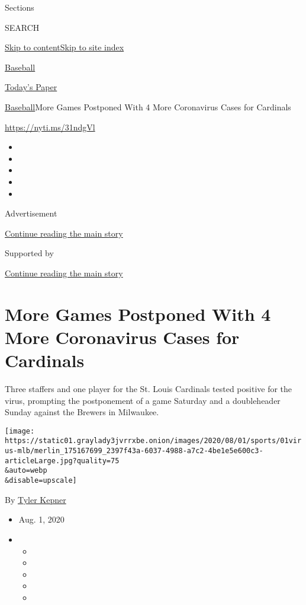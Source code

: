 Sections

SEARCH

\protect\hyperlink{site-content}{Skip to
content}\protect\hyperlink{site-index}{Skip to site index}

\href{https://www.nytimes3xbfgragh.onion/section/sports/baseball}{Baseball}

\href{https://myaccount.nytimes3xbfgragh.onion/auth/login?response_type=cookie\&client_id=vi}{}

\href{https://www.nytimes3xbfgragh.onion/section/todayspaper}{Today's
Paper}

\href{/section/sports/baseball}{Baseball}\textbar{}More Games Postponed
With 4 More Coronavirus Cases for Cardinals

\url{https://nyti.ms/31ndgVl}

\begin{itemize}
\item
\item
\item
\item
\item
\end{itemize}

Advertisement

\protect\hyperlink{after-top}{Continue reading the main story}

Supported by

\protect\hyperlink{after-sponsor}{Continue reading the main story}

\hypertarget{more-games-postponed-with-4-more-coronavirus-cases-for-cardinals}{%
\section{More Games Postponed With 4 More Coronavirus Cases for
Cardinals}\label{more-games-postponed-with-4-more-coronavirus-cases-for-cardinals}}

Three staffers and one player for the St. Louis Cardinals tested
positive for the virus, prompting the postponement of a game Saturday
and a doubleheader Sunday against the Brewers in Milwaukee.

\texttt{[image: https://static01.graylady3jvrrxbe.onion/images/2020/08/01/sports/01virus-mlb/merlin\_175167699\_2397f43a-6037-4988-a7c2-4be1e5e600c3-articleLarge.jpg?quality=75\\\&auto=webp\\\&disable=upscale]}

By \href{https://www.nytimes3xbfgragh.onion/by/tyler-kepner}{Tyler
Kepner}

\begin{itemize}
\item
  Aug. 1, 2020
\item
  \begin{itemize}
  \item
  \item
  \item
  \item
  \item
  \end{itemize}
\end{itemize}

